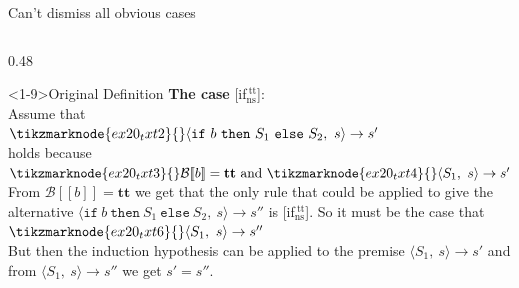\documentclass[xcolor={dvipsnames,table}]{beamer}
\begin{document}
\begin{frame}[fragile]{Can't dismiss all obvious cases}
\begin{columns}[T]
        \begin{column}{0.48\textwidth}
            \begin{block}<1-9>{Original Definition}
\vspace{0.2em}
\scriptsize
{} \textbf{The case} [if$_{\text{ns}}^{\ \text{tt}}$]: \\
Assume that
\\\(
\tikzmarknode{ex20_txt2}{} \langle \mathtt{if}\ b\ \mathtt{then}\ S_1\ \mathtt{else}\ S_2,\ s \rangle \to s'
\)\\
holds because
\\\(
\tikzmarknode{ex20_txt3}{} \mathcal{B}[\![b]\!] = \mathbf{tt}\ \mbox{and}\ \tikzmarknode{ex20_txt4}{} \langle S_1,\ s \rangle \to s'
\)\\
 From \(\mathcal{B}[\![b]\!] = \mathbf{tt}\) we get that the only rule that could be applied to give the
alternative \(\langle \mathtt{if}\ b\ \mathtt{then}\ S_1\ \mathtt{else}\ S_2,\ s \rangle \to s''\) is 
[if$_{\text{ns}}^{\ \text{tt}}$]. So it must be the case that
\\\(
\tikzmarknode{ex20_txt6}{}\langle S_1,\ s \rangle \to s''
\)\\
 But then the induction hypothesis can be applied to the premise \(\langle S_1,\ s \rangle \to s'\)
and from \(\langle S_1,\ s \rangle \to s''\) we get \(s' = s''\).
            \end{block}
        \end{column}
    \end{columns}

\end{frame}
\end{document}

